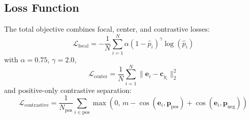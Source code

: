 \documentclass[10pt,letterpaper]{article}
\begin{document}
                                                                                                                  \subsection*{Loss Function}
                                                                                                                  The total objective combines focal, center, and contrastive losses:
                                                                                                                  \begin{equation} \label{eq_rob:20}
                                                                                                                  \mathcal{L}_{\text{focal}} = -\frac{1}{N}\sum_{i=1}^{N}\alpha(1-\hat{p}_i)^\gamma \log(\hat{p}_i)
                                                                                                                  \end{equation}
                                                                                                                  with $\alpha=0.75$, $\gamma=2.0$,
                                                                                                                  \begin{equation} \label{eq_rob:21}
                                                                                                                  \mathcal{L}_{\text{center}} = \frac{1}{N}\sum_{i=1}^{N}\|\mathbf{e}_i - \mathbf{c}_{y_i}\|_2^2
                                                                                                                  \end{equation}
                                                                                                                  and positive-only contrastive separation:
                                                                                                                  \begin{equation} \label{eq_rob:22}
                                                                                                                  \mathcal{L}_{\text{contrastive}}=\frac{1}{N_{\text{pos}}}\sum_{i\in \text{pos}}
                                                                                                                  \max\left(0,\, m-\cos(\mathbf{e}_i,\mathbf{p}_{\text{pos}})+\cos(\mathbf{e}_i,\mathbf{p}_{\text{neg}})\right)
                                                                                                                  \end{equation}
\end{document}
